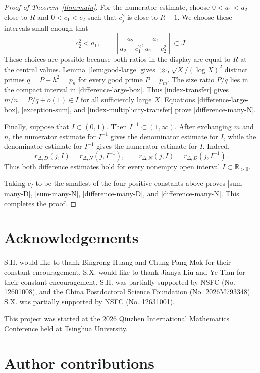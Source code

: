 \documentclass[12pt,reqno]{amsart}
\numberwithin{equation}{section}
\theoremstyle{plain}
\theoremstyle{remark}
\begin{document}
\begin{proof}[Proof of Theorem~\ref{thm:main}]
For the numerator estimate, choose $0<a_1<a_2$ close to $R$ and
$0<c_1<c_2$ such that $c_j^2$ is close to $R-1$.
We choose these intervals small enough that
\begin{equation}\label{difference-large-box}
 c_2^2<a_1,\qquad
 \left[
  \frac{a_2}{a_2-c_1^2},
  \frac{a_1}{a_1-c_2^2}
 \right]\subset J.
\end{equation}
These choices are possible because both ratios in the display are
equal to $R$ at the central values.
Lemma~\ref{lem:good-large} gives
$\gg_I\sqrt X/(\log X)^2$ distinct primes $q=P-h^2=p_n$ for every
good prime $P=p_m$.
The size ratio $P/q$ lies in the compact interval in
\eqref{difference-large-box}.
Thus \eqref{index-transfer} gives $m/n=P/q+o(1)\in I$ for all
sufficiently large $X$.
Equations \eqref{difference-large-box}, \eqref{exception-sum}, and
\eqref{index-multiplicity-transfer} prove
\eqref{difference-many-N}.

Finally, suppose that $I\subset(0,1)$.
Then $I^{-1}\subset(1,\infty)$.
After exchanging $m$ and $n$, the numerator estimate for $I^{-1}$
gives the denominator estimate for $I$, while the denominator
estimate for $I^{-1}$ gives the numerator estimate for $I$.
Indeed,
\[
 r_{\Delta,D}(j,I)=r_{\Delta,N}(j,I^{-1}),
 \qquad
 r_{\Delta,N}(j,I)=r_{\Delta,D}(j,I^{-1}).
\]
Thus both difference estimates hold for every nonempty open interval
$I\subset\mathbb R_{>0}$.

Taking $c_I$ to be the smallest of the four positive constants above
proves \eqref{sum-many-D}, \eqref{sum-many-N},
\eqref{difference-many-D}, and \eqref{difference-many-N}.
This completes the proof.
\end{proof}

\section*{Acknowledgements}
S.H. would like to thank Bingrong Huang and Chung Pang Mok for their constant encouragement.
S.X. would like to thank Jianya Liu and Ye Tian for their constant encouragement.
S.H. was partially supported by NSFC (No. 12601008), and the China Postdoctoral Science Foundation (No. 2026M793348).
S.X. was partially supported by NSFC (No. 12631001).

This project was started at the 2026 Qiuzhen International Mathematics Conference held at Tsinghua University.

\section*{Author contributions}
\end{document}

